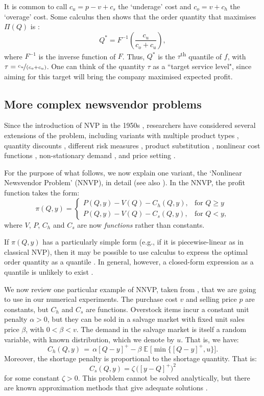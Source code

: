 \documentclass{article}
\DeclareMathOperator{\E}{\mathbb{E}}
\begin{document}
It is common to call $c_u= p-v+c_s$ the ‘underage’ cost and $c_o = v+c_h$ the ‘overage’ cost. Some calculus then shows that the order quantity that maximises $\Pi(Q)$ is \cite{Ch12}:
\[
    Q^* = F^{-1}\left( \frac{c_u}{c_o+c_u} \right),
\]
where $F^{-1}$ is the inverse function of $F$. Thus, $Q^*$ is the $\tau$\textsuperscript{th} quantile of $f$, with $\tau=\nicefrac{c_u}{(c_o+c_u)}$. One can think of the quantity
$\tau$ as a ``target service level", since aiming for this target will bring the company maximised expected profit.

\subsection{More complex newsvendor problems} %

Since the introduction of NVP in the 1950s \cite{AHM51,MK51}, researchers have considered several extensions of the problem, including variants with multiple product types \cite{HW63,LL96,MS00}, quantity discounts \cite{Kh95}, different risk measures \cite{EGS95}, product substitution \cite{BAA99}, nonlinear cost functions \cite{HOS12}, non-stationary demand \cite{KWH15}, and price setting \cite{KC62,Mi59,PD99}.

For the purpose of what follows, we now explain one variant, the `Nonlinear Newsvendor Problem' (NNVP), in detail (see also \cite{BT06,HOS12,HN16,KC62,Kh95,KK18,Mi59,PSC15,PD99,Po90,Po02}). In the NNVP, the profit function takes the form:
\[
    \pi(Q,y)=
    \begin{cases}
        P(Q,y)-V(Q)-C_h(Q,y),& \text{for } Q \geq y\\
        P(Q,y)-V(Q)-C_s(Q,y),& \text{for } Q< y,
    \end{cases}
\]
where $V$, $P$, $C_h$ and $C_s$ are now \emph{functions} rather than constants.

If $\pi(Q,y)$ has a particularly simple form (e.g., if it is piecewise-linear as in classical NVP), then it may be possible to  use calculus to express the optimal order quantity as a quantile \cite{Ch12}. In general, however, a closed-form expression as a quantile is unlikely to exist \cite{HOS12,Po02}.

We now review one particular example of NNVP, taken from \cite{KK18,PD99,Ro02}, that we are going to use in our numerical experiments. The purchase cost $v$ and selling price $p$ are constants, but $C_h$ and $C_s$ are functions. Overstock items incur a constant unit penalty $\alpha > 0$, but they can be sold in a salvage market with fixed unit sales price $\beta$, with $0<\beta<v$. The demand in the salvage market is itself a random variable, with known distribution, which we denote by $u$. That is, we have:
\[
    C_h(Q,y) \, = \, \alpha[Q-y]^{+} - \beta \E \Big[ \min \big\{ [Q-y]^{+},u \big\} \Big].
\]
Moreover, the shortage penalty is proportional to the shortage quantity. That is:
\[
C_s(Q,y) =  \zeta \, \big( [y-Q]^{+} \big)^2
\]
for some constant $\zeta > 0$. This problem cannot be solved analytically, but there are known approximation methods that give adequate solutions \cite{KK18}.
\end{document}

